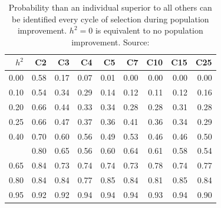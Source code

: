 \documentclass[11pt,ignorenonframetext,aspectratio=169]{beamer}
\begin{document}
\begin{frame}{}
\protect\hypertarget{section-3}{}
\begin{table}

\caption{\label{tab:probability-of-success-in-recurrent-selection}Probability than an individual superior to all others can be identified every cycle of selection during population improvement. $h^2 = 0$ is equivalent to no population improvement. Source: \cite{rutkoski2019practical}}
\centering
\fontsize{6}{8}\selectfont
\begin{tabular}[t]{rrrrrrrrr}
\toprule
$h^2$ & C2 & C3 & C4 & C5 & C7 & C10 & C15 & C25\\
\midrule
0.00 & 0.58 & 0.17 & 0.07 & 0.01 & 0.00 & 0.00 & 0.00 & 0.00\\
0.10 & 0.54 & 0.34 & 0.29 & 0.14 & 0.12 & 0.11 & 0.12 & 0.16\\
0.20 & 0.66 & 0.44 & 0.33 & 0.34 & 0.28 & 0.28 & 0.31 & 0.28\\
0.25 & 0.66 & 0.47 & 0.37 & 0.36 & 0.41 & 0.36 & 0.34 & 0.29\\
0.40 & 0.70 & 0.60 & 0.56 & 0.49 & 0.53 & 0.46 & 0.46 & 0.50\\
\addlinespace
0.50 & 0.80 & 0.65 & 0.56 & 0.60 & 0.64 & 0.61 & 0.58 & 0.54\\
0.65 & 0.84 & 0.73 & 0.74 & 0.74 & 0.73 & 0.78 & 0.74 & 0.77\\
0.80 & 0.84 & 0.84 & 0.77 & 0.85 & 0.84 & 0.81 & 0.85 & 0.84\\
0.95 & 0.92 & 0.92 & 0.94 & 0.94 & 0.94 & 0.93 & 0.94 & 0.90\\
\bottomrule
\end{tabular}
\end{table}
\end{frame}
\end{document}

